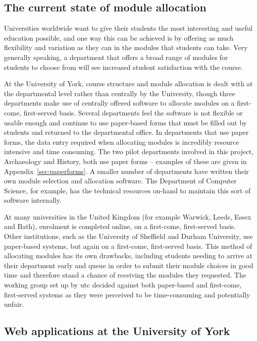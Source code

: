 \subsection{The current state of module allocation}


Universities worldwide want to give their students the most interesting and
useful education possible, and one way this can be achieved is by offering as
much flexibility and variation as they can in the modules that students can
take. Very generally speaking, a department that offers a broad range of
modules for students to choose from will see increased student satisfaction
with the course.

At the University of York, course structure and module allocation is dealt
with at the departmental level rather than centrally by the University, though
three departments make use of centrally offered software to allocate modules
on a first-come, first-served basis. Several departments feel the software is
not flexible or usable enough and continue to use paper-based forms that must
be filled out by students and returned to the departmental office. In
departments that use paper forms, the data entry required when allocating
modules is incredibly resource intensive and time consuming. The two pilot
departments involved in this project, Archaeology and History, both use paper
forms -- examples of these are given in Appendix~\ref{sec:paperforms}. A
smaller number of departments have written their own module selection and
allocation software. The Department of Computer Science, for example, has the
technical resources on-hand to maintain this sort of software internally.

At many universities in the United Kingdom (for example Warwick, Leeds, Essex
and Bath), enrolment is completed online, on a first-come, first-served basis.
Other institutions, such as the University of Sheffield and Durham University,
use paper-based systems, but again on a first-come, first-served basis. This
method of allocating modules has its own drawbacks, including students needing
to arrive at their department early and queue in order to submit their module
choices in good time and therefore stand a chance of receiving the modules
they requested. The working group set up by \gls{utc} decided against both
paper-based and first-come, first-served systems as they were perceived to be
time-consuming and potentially unfair.

\subsection{Web applications at the University of York}
\label{sec:webapps_york}

